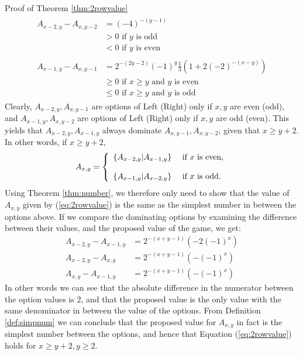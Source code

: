 \begin{proof2}{Proof of Theorem \ref{thm:2rowvalue}}
\begin{align*}
\begin{split}
A_{x-2,y}-A_{x,y-2}&=(-4)^{-(y-1)}\\
&>0\text{ if $y$ is odd}\\
&<0\text{ if $y$ is even}
\end{split}\\
\begin{split}
A_{x-1,y}-A_{x,y-1}&=2^{-(2y-2)}(-1)^y\frac{1}{3}\left(1+2(-2)^{-(x-y)}\right)\\
&\ge0\text{ if $x\ge y$ and $y$ is even}\\
&\le0\text{ if $x\ge y$ and $y$ is odd}
\end{split}
\end{align*}
Clearly, $A_{x-2,y},A_{x,y-1}$ are options of Left (Right) only if $x,y$ are even (odd), and $A_{x-1,y},A_{x,y-2}$ are options of Left (Right) only if $x,y$ are odd (even). This yields that $A_{x-2,y},A_{x-1,y}$ always dominate $A_{x,y-1},A_{x,y-2}$, given that $x\ge y+2$. 
\\
In other words, if $x\ge y+2$, 
\begin{align*}
A_{x,y}=\left\{
\begin{array}{l l}
\left\{A_{x-2,y}\middle|A_{x-1,y}\right\}&\text{ if $x$ is even,}\\
~\\
\left\{A_{x-1,y}\middle|A_{x-2,y}\right\}&\text{ if $x$ is odd.}
\end{array}\right.
\end{align*}
Using Theorem \ref{thm:number}, we therefore only need to show that the value of $A_{x,y}$ given by (\ref{eq:2rowvalue}) is the same as the simplest number in between the options above. If we compare the dominating options by examining the difference between their values, and the proposed value of the game, we get:
\begin{equation}
\begin{split}
A_{x-2,y}-A_{x-1,y}&=2^{-(x+y-1)}\left(-2(-1)^x\right)\\
A_{x-2,y}-A_{x,y}&=2^{-(x+y-1)}\left(-(-1)^x\right)\\
A_{x,y}-A_{x-1,y}&=2^{-(x+y-1)}\left(-(-1)^x\right)
\end{split}\tag{*}
\label{eq:2simpldiff}
\end{equation}
In other words we can see that the absolute difference in the numerator between the option values is 2, and that the proposed value is the only value with the same denominator in between the value of the options. From Definition \ref{def:simpnum} we can conclude that the proposed value for $A_{x,y}$ in fact is the simplest number between the options, and hence that Equation (\ref{eq:2rowvalue}) holds for $x\ge y+2,y\ge2$.

\end{proof2}
